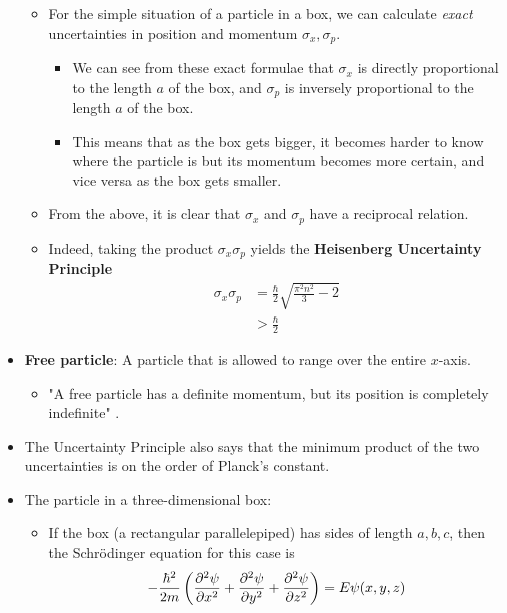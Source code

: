 \documentclass[../notes.tex]{subfiles}
\begin{document}
\begin{itemize}
    \begin{itemize}
        \item For the simple situation of a particle in a box, we can calculate \emph{exact} uncertainties in position and momentum $\sigma_x,\sigma_p$.
        \begin{itemize}
            \item We can see from these exact formulae that $\sigma_x$ is directly proportional to the length $a$ of the box, and $\sigma_p$ is inversely proportional to the length $a$ of the box.
            \item This means that as the box gets bigger, it becomes harder to know where the particle is but its momentum becomes more certain, and vice versa as the box gets smaller.
        \end{itemize}
        \item From the above, it is clear that $\sigma_x$ and $\sigma_p$ have a reciprocal relation.
        \item Indeed, taking the product $\sigma_x\sigma_p$ yields the \textbf{Heisenberg Uncertainty Principle}
        \begin{align*}
            \sigma_x\sigma_p &= \frac{\hbar}{2}\sqrt{\frac{\pi^2n^2}{3}-2}\\
            &> \frac{\hbar}{2}
        \end{align*}
    \end{itemize}
    \item \textbf{Free particle}: A particle that is allowed to range over the entire $x$-axis.
    \begin{itemize}
        \item "A free particle has a definite momentum, but its position is completely indefinite" \parencite[90]{bib:McQuarrieSimon}.
    \end{itemize}
    \item The Uncertainty Principle also says that the minimum product of the two uncertainties is on the order of Planck's constant.
    \item The particle in a three-dimensional box:
    \begin{itemize}
        \item If the box (a rectangular parallelepiped) has sides of length $a,b,c$, then the Schr\"{o}dinger equation for this case is
        \begin{equation*}
            -\frac{\hbar^2}{2m}\left( \pdv[2]{\psi}{x}+\pdv[2]{\psi}{y}+\pdv[2]{\psi}{z} \right) = E\psi(x,y,z)
        \end{equation*}

\end{itemize}
\end{itemize}
\end{document}
